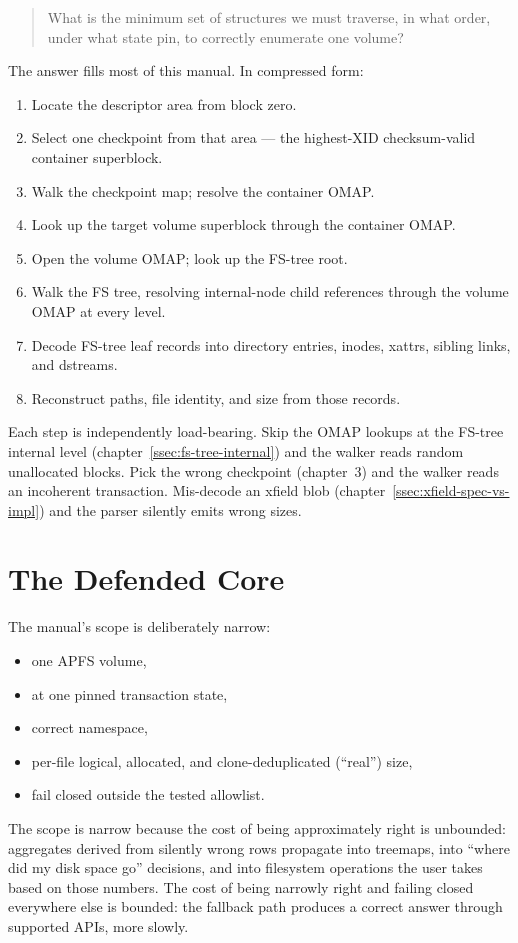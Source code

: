 \begin{quote}
What is the minimum set of structures we must traverse, in what
order, under what state pin, to correctly enumerate one volume?
\end{quote}

\noindent The answer fills most of this manual. In compressed form:

\begin{enumerate}
  \item Locate the descriptor area from block zero.
  \item Select one checkpoint from that area --- the
    highest-XID checksum-valid container superblock.
  \item Walk the checkpoint map; resolve the container OMAP.
  \item Look up the target volume superblock through the
    container OMAP.
  \item Open the volume OMAP; look up the FS-tree root.
  \item Walk the FS tree, resolving internal-node child
    references through the volume OMAP at every level.
  \item Decode FS-tree leaf records into directory entries,
    inodes, xattrs, sibling links, and dstreams.
  \item Reconstruct paths, file identity, and size from those
    records.
\end{enumerate}

Each step is independently load-bearing. Skip the OMAP lookups at
the FS-tree internal level (chapter~\ref{ssec:fs-tree-internal})
and the walker reads random unallocated blocks. Pick the wrong
checkpoint (chapter~3) and the walker reads an incoherent
transaction. Mis-decode an xfield blob
(chapter~\ref{ssec:xfield-spec-vs-impl}) and the parser silently
emits wrong sizes.

\section{The Defended Core}

The manual's scope is deliberately narrow:

\begin{itemize}
  \item one APFS volume,
  \item at one pinned transaction state,
  \item correct namespace,
  \item per-file logical, allocated, and clone-deduplicated
    (``real'') size,
  \item fail closed outside the tested allowlist.
\end{itemize}

The scope is narrow because the cost of being approximately right
is unbounded: aggregates derived from silently wrong rows
propagate into treemaps, into ``where did my disk space go''
decisions, and into filesystem operations the user takes based on
those numbers. The cost of being narrowly right and failing closed
everywhere else is bounded: the fallback path produces a correct
answer through supported APIs, more slowly.
